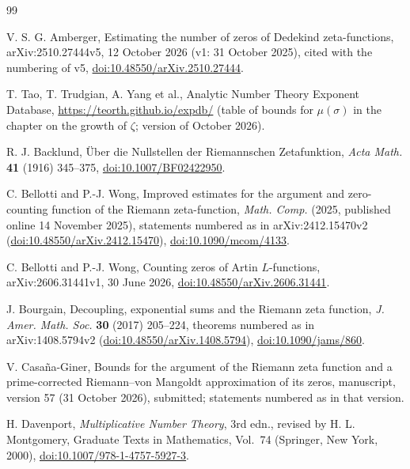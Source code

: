 \documentclass[11pt,reqno]{amsart}
\numberwithin{equation}{section}
\theoremstyle{definition}
\theoremstyle{remark}
\begin{document}
\begin{thebibliography}{99}

 V. S. G. Amberger, Estimating the number of zeros of Dedekind zeta-functions, arXiv:2510.27444v5, 12 October 2026 (v1: 31 October 2025), cited with the numbering of v5, \href{https://doi.org/10.48550/arXiv.2510.27444}{doi:10.48550/arXiv.2510.27444}.

 T. Tao, T. Trudgian, A. Yang et al., Analytic Number Theory Exponent Database, \url{https://teorth.github.io/expdb/} (table of bounds for $\mu(\sigma)$ in the chapter on the growth of $\zeta$; version of October 2026).

 R. J. Backlund, \"Uber die Nullstellen der Riemannschen Zetafunktion, \textit{Acta Math.} \textbf{41} (1916) 345--375, \href{https://doi.org/10.1007/BF02422950}{doi:10.1007/BF02422950}.

 C. Bellotti and P.-J. Wong, Improved estimates for the argument and zero-counting function of the Riemann zeta-function, \textit{Math. Comp.} (2025, published online 14 November 2025), statements numbered as in arXiv:2412.15470v2 (\href{https://doi.org/10.48550/arXiv.2412.15470}{doi:10.48550/arXiv.2412.15470}), \href{https://doi.org/10.1090/mcom/4133}{doi:10.1090/mcom/4133}.

 C. Bellotti and P.-J. Wong, Counting zeros of Artin $L$-functions, arXiv:2606.31441v1, 30 June 2026, \href{https://doi.org/10.48550/arXiv.2606.31441}{doi:10.48550/arXiv.2606.31441}.

 J. Bourgain, Decoupling, exponential sums and the Riemann zeta function, \textit{J. Amer. Math. Soc.} \textbf{30} (2017) 205--224, theorems numbered as in arXiv:1408.5794v2 (\href{https://doi.org/10.48550/arXiv.1408.5794}{doi:10.48550/arXiv.1408.5794}), \href{https://doi.org/10.1090/jams/860}{doi:10.1090/jams/860}.

 V. Casa\~na-Giner, Bounds for the argument of the Riemann zeta function and a prime-corrected Riemann--von Mangoldt approximation of its zeros, manuscript, version 57 (31 October 2026), submitted; statements numbered as in that version.

 H. Davenport, \textit{Multiplicative Number Theory}, 3rd edn., revised by H. L. Montgomery, Graduate Texts in Mathematics, Vol.~74 (Springer, New York, 2000), \href{https://doi.org/10.1007/978-1-4757-5927-3}{doi:10.1007/978-1-4757-5927-3}.


\end{thebibliography}
\end{document}
